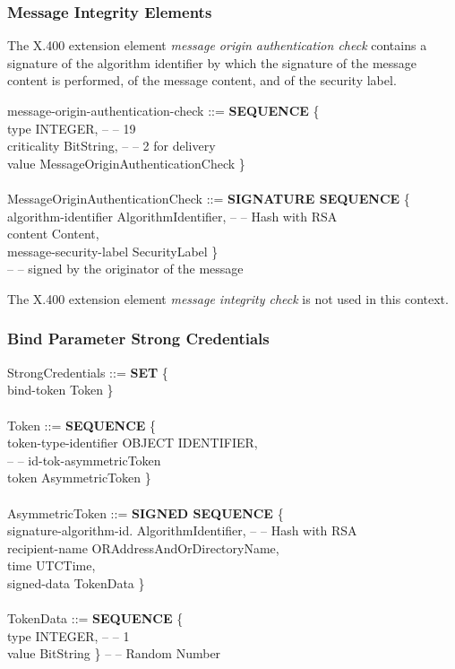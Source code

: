 \subsubsection{Message Integrity Elements}
\label{asn1-integrity}

The X.400 extension element
{\em message origin authentication check}
contains a signature of the algorithm identifier
by which the signature of the message content is performed,
of the message content,
and of the security label.

{\small
\btab
\1 message-origin-authentication-check ::= {\bf SEQUENCE} \{ \\
\2         type  \3 [0] INTEGER, -- -- 19 \\
\2         criticality  \3 [1] BitString, -- -- 2 for delivery \\
\2         value \3 [2] MessageOriginAuthenticationCheck \} \\
\\
\1 MessageOriginAuthenticationCheck ::= {\bf SIGNATURE SEQUENCE} \{ \\
\2 algorithm-identifier \3   AlgorithmIdentifier, -- -- Hash with RSA \\
\2 content \3                Content, \\
\2 message-security-label \3 SecurityLabel \} \\
\2 -- -- signed by the originator of the message
\etab
}

The X.400 extension element
{\em message integrity check}
is not used in this context.

\subsubsection{Bind Parameter Strong Credentials}
\label{asn1-cred}

{\small
\btab
\1 StrongCredentials ::= {\bf SET} \{ \\
\2 bind-token \3 [0] Token \} \\
\\
\1 Token ::= {\bf SEQUENCE} \{ \\
\2 token-type-identifier \3 [0] OBJECT IDENTIFIER, \\
\2                       \3 -- -- id-tok-asymmetricToken \\
\2 token \3 [1] AsymmetricToken \} \\
\\
\1 AsymmetricToken ::= {\bf SIGNED SEQUENCE} \{  \\
\2 signature-algorithm-id. \3 AlgorithmIdentifier, -- -- Hash with RSA \\
\2 recipient-name \3 ORAddressAndOrDirectoryName, \\
\2 time  \3 UTCTime, \\
\2 signed-data \3 [0] TokenData \} \\
\\
\1 TokenData ::= {\bf SEQUENCE} \{ \\
\2 type  \3 [0] INTEGER, -- -- 1  \\
\2 value \3 [1] BitString \} -- -- Random Number \\
\\
\etab
}


